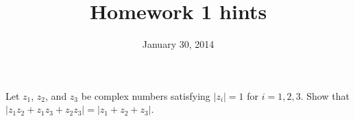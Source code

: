 
         \newcommand\alg[1]{\ensuremath{\mathbf{#1}}}
         \newcommand{\<}{\ensuremath{\langle}}
         \renewcommand{\>}{\ensuremath{\rangle}}
         \newcommand\fld[1]{\ensuremath{\mathbb{#1}}}

         \author{}
         \title{Homework 1 hints}
         \date{January 30, 2014}



\maketitle

\begin{prob}[Golan 16]
Let $z_1$, $z_2$, and $z_3$ be complex numbers satisfying 
$|z_i| = 1$ for $i = 1, 2, 3$. Show that 
$|z_1 z_2 + z_1 z_3 + z_2 z_3 | = |z_1 + z_2 + z_3|$.
\end{prob}

